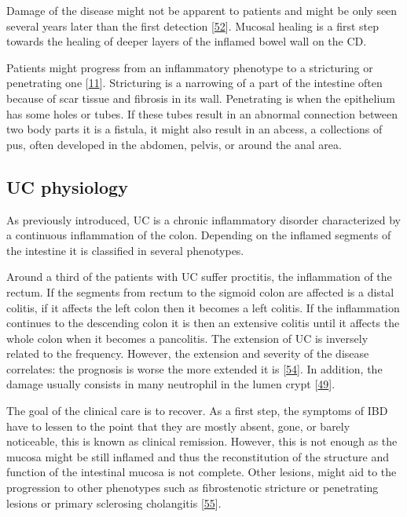 \documentclass[
  a4paper,
]{book}
\begin{document}
Damage of the disease might not be apparent to patients and might be only seen several years later than the first detection {[}\protect\hyperlink{ref-bhattacharya2016}{52}{]}.
Mucosal healing is a first step towards the healing of deeper layers of the inflamed bowel wall on the CD.

Patients might progress from an inflammatory phenotype to a stricturing or penetrating one {[}\protect\hyperlink{ref-satsangi2006}{11}{]}.
Stricturing is a narrowing of a part of the intestine often because of scar tissue and fibrosis in its wall.
Penetrating is when the epithelium has some holes or tubes.
If these tubes result in an abnormal connection between two body parts it is a fistula, it might also result in an abcess, a collections of pus, often developed in the abdomen, pelvis, or around the anal area.

\hypertarget{UC}{%
\subsection{UC physiology}\label{UC}}

As previously introduced, UC is a chronic inflammatory disorder characterized by a continuous inflammation of the colon.
Depending on the inflamed segments of the intestine it is classified in several phenotypes.

Around a third of the patients with UC suffer proctitis, the inflammation of the rectum.
If the segments from rectum to the sigmoid colon are affected is a distal colitis, if it affects the left colon then it becomes a left colitis.
If the inflammation continues to the descending colon it is then an extensive colitis until it affects the whole colon when it becomes a pancolitis.
The extension of UC is inversely related to the frequency.
However, the extension and severity of the disease correlates: the prognosis is worse the more extended it is {[}\protect\hyperlink{ref-etchevers2009}{54}{]}.
In addition, the damage usually consists in many neutrophil in the lumen crypt {[}\protect\hyperlink{ref-bassolasmolina2018}{49}{]}.

The goal of the clinical care is to recover.
As a first step, the symptoms of IBD have to lessen to the point that they are mostly absent, gone, or barely noticeable, this is known as clinical remission.
However, this is not enough as the mucosa might be still inflamed and thus the reconstitution of the structure and function of the intestinal mucosa is not complete.
Other lesions, might aid to the progression to other phenotypes such as fibrostenotic stricture or penetrating lesions or primary sclerosing cholangitis {[}\protect\hyperlink{ref-boonstra2012}{55}{]}.
\end{document}
